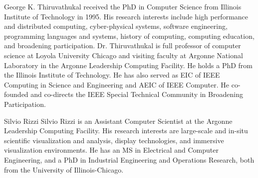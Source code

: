 \documentclass[10pt,journal,compsoc]{IEEEtran}
\begin{document}
\begin{IEEEbiography}{George K. Thiruvathukal}
received the PhD in Computer Science from Illinois Institute of Technology in 1995. His research interests include high performance and distributed computing, cyber-physical systems, software engineering, programming languages and systems, history of computing, computing education, and broadening participation. Dr. Thiruvathukal is full professor of computer science at Loyola University Chicago and visiting faculty at Argonne National Laboratory in the Argonne Leadership Computing Facility. He holds a PhD from the Illinois Institute of Technology. He has also served as EIC of IEEE Computing in Science and Engineering and AEIC of IEEE Computer. He co-founded and co-directs the IEEE Special Technical Community in Broadening Participation.
\end{IEEEbiography}


\begin{IEEEbiography}{Silvio Rizzi}
Silvio Rizzi is an Assistant Computer Scientist at the Argonne Leadership Computing Facility. His research interests are large-scale and in-situ scientific visualization and analysis, display technologies, and immersive visualization environments. He has an MS in Electrical and Computer Engineering, and a PhD in Industrial Engineering and Operations Research, both from the University of Illinois-Chicago.
\end{IEEEbiography}
\end{document}
